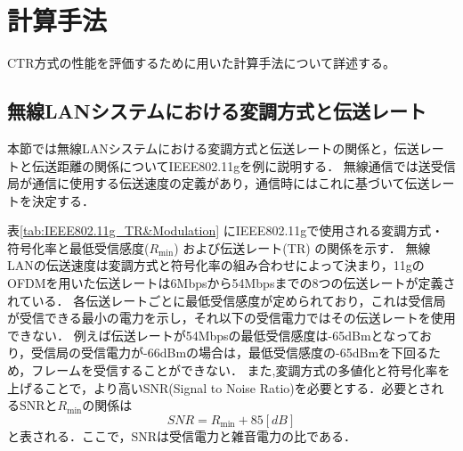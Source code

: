 \documentclass[a4paper,10.5pt]{ltjsarticle}
\begin{document}
\clearpage
\section{計算手法}
CTR方式の性能を評価するために用いた計算手法について詳述する。

\subsection{無線LANシステムにおける変調方式と伝送レート}
本節では無線LANシステムにおける変調方式と伝送レートの関係と，伝送レートと伝送距離の関係についてIEEE802.11gを例に説明する．
無線通信では送受信局が通信に使用する伝送速度の定義があり，通信時にはこれに基づいて伝送レートを決定する．\par
表\ref{tab:IEEE802.11g_TR&Modulation} にIEEE802.11gで使用される変調方式・符号化率と最低受信感度($R_{\text{min}}$) および伝送レート(TR) の関係を示す．
無線LANの伝送速度は変調方式と符号化率の組み合わせによって決まり，11gのOFDMを用いた伝送レートは6Mbpsから54Mbpsまでの8つの伝送レートが定義されている．
各伝送レートごとに最低受信感度が定められており，これは受信局が受信できる最小の電力を示し，それ以下の受信電力ではその伝送レートを使用できない．
例えば伝送レートが54Mbpsの最低受信感度は-65dBmとなっており，受信局の受信電力が-66dBmの場合は，最低受信感度の-65dBmを下回るため，フレームを受信することができない．
また,変調方式の多値化と符号化率を上げることで，より高いSNR(Signal to Noise Ratio)を必要とする．必要とされるSNRと$R_{\text{min}}$の関係は
\begin{equation}
  SNR = R_{\text{min}} + 85[dB]
\end{equation}
と表される．ここで，SNRは受信電力と雑音電力の比である．
\end{document}
